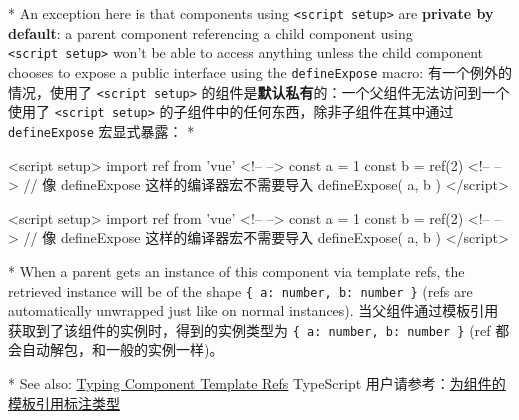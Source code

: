 \begin{paracol}{2}
\switchcolumn[0]*%
An exception here is that components using
\texttt{\textless{}script\ setup\textgreater{}} are \textbf{private by
default}: a parent component referencing a child component using
\texttt{\textless{}script\ setup\textgreater{}} won't be able to access
anything unless the child component chooses to expose a public interface
using the \texttt{defineExpose} macro:
\switchcolumn
有一个例外的情况，使用了 \texttt{\textless{}script\ setup\textgreater{}}
的组件是\textbf{默认私有}的：一个父组件无法访问到一个使用了
\texttt{\textless{}script\ setup\textgreater{}}
的子组件中的任何东西，除非子组件在其中通过 \texttt{defineExpose}
宏显式暴露：
\switchcolumn[0]*%
\begin{codeHtml}
<script setup>
import { ref } from 'vue'
<!-- -->
const a = 1
const b = ref(2)
<!-- -->
// 像 defineExpose 这样的编译器宏不需要导入
defineExpose({
  a,
  b
})
</script>
\end{codeHtml}
\switchcolumn
\begin{codeHtml}
<script setup>
import { ref } from 'vue'
<!-- -->
const a = 1
const b = ref(2)
<!-- -->
// 像 defineExpose 这样的编译器宏不需要导入
defineExpose({
  a,
  b
})
</script>
\end{codeHtml}
\switchcolumn[0]*%
When a parent gets an instance of this component via template refs, the
retrieved instance will be of the shape
\texttt{\{\ a:\ number,\ b:\ number\ \}} (refs are automatically
unwrapped just like on normal instances).
\switchcolumn
当父组件通过模板引用获取到了该组件的实例时，得到的实例类型为
\texttt{\{\ a:\ number,\ b:\ number\ \}} (ref
都会自动解包，和一般的实例一样)。


\switchcolumn[0]*%
See also:
\href{https://vuejs.org/guide/typescript/composition-api.html\#typing-component-template-refs}{Typing
Component Template Refs}
\switchcolumn
TypeScript
用户请参考：\href{https://cn.vuejs.org/guide/typescript/composition-api.html\#typing-component-template-refs}{为组件的模板引用标注类型}
\end{paracol}
